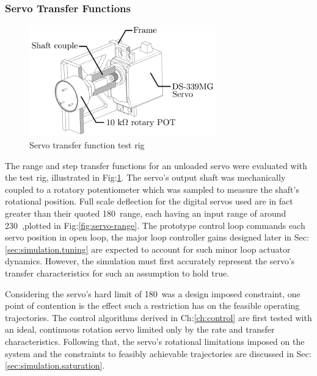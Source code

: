\subsubsection*{Servo Transfer Functions}
\begin{figure}[htbp]
\centering
\includegraphics[width=0.72\textwidth]{figs/servo-position}
\vspace{-6pt}
\caption{Servo transfer function test rig}
\label{fig:servo-position}
\end{figure}
The range and step transfer functions for an unloaded servo were evaluated with the test rig, illustrated in Fig:\ref{fig:servo-position}. The servo's output shaft was mechanically coupled to a rotatory potentiometer which was sampled to measure the shaft's rotational position. Full scale deflection for the digital servos used are in fact greater than their quoted 180\textdegree ~range, each having an input range of around 230\textdegree ~,plotted in Fig:\ref{fig:servo-range}. The prototype control loop commands each servo position in open loop, the major loop controller gains designed later in Sec:\ref{sec:simulation.tuning} are expected to account for such minor loop actuator dynamics. However, the simulation must first accurately represent the servo's transfer characteristics for such an assumption to hold true. 
\par
Considering the servo's hard limit of 180\textdegree ~was a design imposed constraint, one point of contention is the effect such a restriction has on the feasible operating trajectories. The control algorithms derived in Ch:\ref{ch:control} are first tested with an ideal, continuous rotation servo limited only by the rate and transfer characteristics. Following that, the servo's rotational limitations imposed on the system and the constraints to feasibly achievable trajectories are discussed in Sec:\ref{sec:simulation.saturation}.
